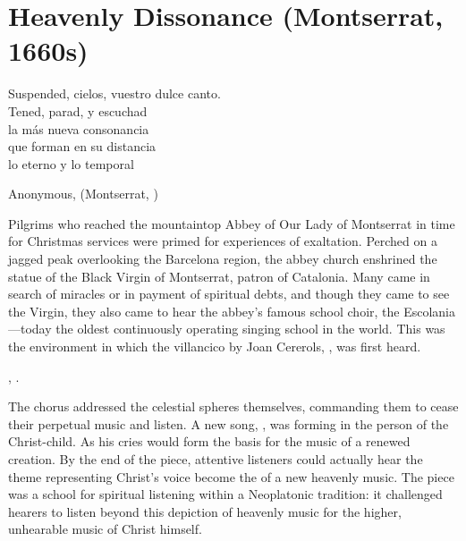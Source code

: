 
% 
% 
%

\chapter[Heavenly Dissonance]
{Heavenly Dissonance (Montserrat, 1660s)}
\label{ch:cererols-suspended}

\epigraph
{Suspended, cielos, vuestro dulce canto. \\
Tened, parad, y escuchad \\
la más nueva consonancia \\
que forman en su distancia \\
lo eterno y lo temporal}
{Anonymous,  (Montserrat, )}

Pilgrims who reached the mountaintop Abbey of Our Lady of Montserrat in time for
Christmas services were primed for experiences of exaltation.
Perched on a jagged peak overlooking the Barcelona region, the abbey church
enshrined the statue of the Black Virgin of Montserrat, patron of Catalonia.
Many came in search of miracles or in payment of spiritual debts, and though
they came to see the Virgin, they also came to hear the abbey's famous school
choir, the Escolania---today the oldest continuously operating singing school in
the world.%
    \Autocite
    [On Spanish Marian devotion and shrines, see][]
    {Christian:LocalReligion}
This was the environment in which the villancico by Joan Cererols,
, was first heard.%
\begin{Footnote}
    , 
    \autocites
    [35--36, 49--118]{Cashner:WLSCM32}
    [xxv, 221--236]{Cererols:MEM-VC}.
\end{Footnote}
The chorus addressed the celestial spheres themselves, commanding them to cease
their perpetual music and listen.  
A new song, , was forming in the person of the
Christ-child. 
As  his cries would form the basis for the music of a
renewed creation.
By the end of the piece, attentive listeners could actually hear the theme
representing Christ's voice become the  of a new heavenly
music. 
The piece was a school for spiritual listening within a Neoplatonic tradition:
it challenged hearers to listen beyond this depiction of heavenly music for the
higher, unhearable music of Christ himself.

